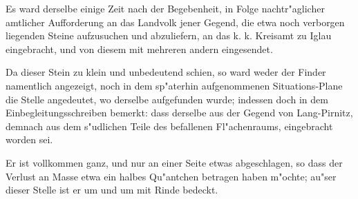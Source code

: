 \documentclass[a4paper, 11pt, oneside, german]{article}
\begin{document}
Es ward derselbe einige Zeit nach der Begebenheit, in Folge nachtr"aglicher amtlicher Aufforderung an das Landvolk jener Gegend, die etwa noch verborgen liegenden Steine aufzusuchen und abzuliefern, an das k. k. Kreisamt zu Iglau eingebracht, und von diesem mit mehreren andern eingesendet.

Da dieser Stein zu klein und unbedeutend schien, so ward weder der Finder namentlich angezeigt, noch in dem sp"aterhin aufgenommenen Situations-Plane die Stelle angedeutet, wo derselbe aufgefunden wurde; indessen doch in dem Einbegleitungsschreiben bemerkt: dass derselbe aus der Gegend von Lang-Pirnitz, demnach aus dem s"udlichen Teile des befallenen Fl"achenraums, eingebracht worden sei.

Er ist vollkommen ganz, und nur an einer Seite etwas abgeschlagen, so dass der Verlust an Masse etwa ein halbes Qu"antchen betragen haben m"ochte; au"ser dieser Stelle ist er um und um mit Rinde bedeckt.
\end{document}
